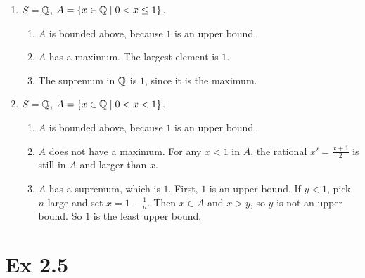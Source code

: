 \documentclass{report}
\begin{document}
\begin{proofWithHibiscus}
\begin{enumerate}
    \item $S = \mathbb{Q}$, $A = \{x \in \mathbb{Q} \mid 0<x \le 1\}$.  
      \begin{enumerate}
        \item $A$ is bounded above, because $1$ is an upper bound.  
        \item $A$ has a maximum. The largest element is $1$.  
        \item The supremum in $\mathbb{Q}$ is $1$, since it is the maximum.  
      \end{enumerate}
  
    \item $S = \mathbb{Q}$, $A = \{x \in \mathbb{Q} \mid 0<x<1\}$.  
      \begin{enumerate}
        \item $A$ is bounded above, because $1$ is an upper bound.  
        \item $A$ does not have a maximum. For any $x<1$ in $A$, the rational $x'=\tfrac{x+1}{2}$ is still in $A$ and larger than $x$.  
        \item $A$ has a supremum, which is $1$. First, $1$ is an upper bound. If $y<1$, pick $n$ large and set $x=1-\tfrac1n$. Then $x \in A$ and $x>y$, so $y$ is not an upper bound. So $1$ is the least upper bound.  
      \end{enumerate}
  \end{enumerate}
  \end{proofWithHibiscus}
  

\section*{Ex 2.5}


\end{document}
